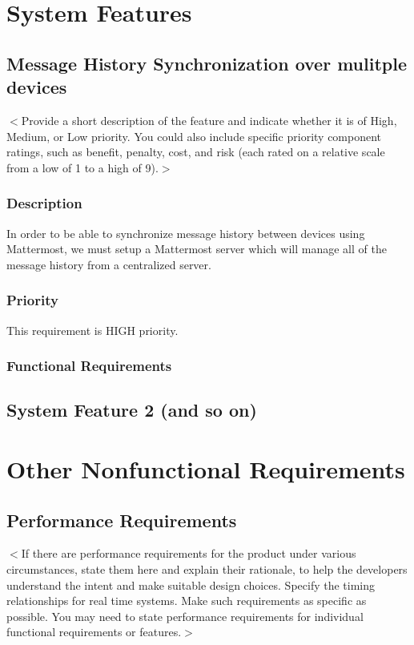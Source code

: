 \documentclass{scrreprt}
\begin{document}
\chapter{System Features}

\section{Message History Synchronization over mulitple devices}
$<$Provide a short description of the feature and indicate whether it is of
High, Medium, or Low priority. You could also include specific priority
component ratings, such as benefit, penalty, cost, and risk (each rated on a
relative scale from a low of 1 to a high of 9).$>$
\subsection{Description}
In order to be able to synchronize message history between devices using
Mattermost, we must setup a Mattermost server which will manage all of the
message history from a centralized server.
\subsection{Priority}
This requirement is HIGH priority.
\subsection{Functional Requirements}


\section{System Feature 2 (and so on)}


\chapter{Other Nonfunctional Requirements}

\section{Performance Requirements}
$<$If there are performance requirements for the product under various
circumstances, state them here and explain their rationale, to help the
developers understand the intent and make suitable design choices. Specify the
timing relationships for real time systems. Make such requirements as specific
as possible. You may need to state performance requirements for individual
functional requirements or features.$>$
\end{document}
